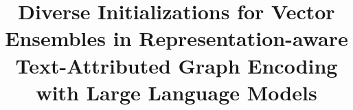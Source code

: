 \documentclass[a4paper,fleqn]{cas-sc}
\begin{document}
\let\WriteBookmarks\relax
\def\floatpagepagefraction{1}
\def\textpagefraction{.001}

\title [mode = title]{Diverse Initializations for Vector Ensembles in Representation-aware Text-Attributed Graph Encoding with Large Language Models}   








\end{document}
